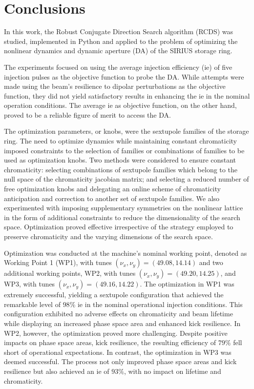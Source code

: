 \chapter{Conclusions}

In this work, the Robust Conjugate Direction Search algorithm (\gls*{RCDS}) was studied, implemented in Python and applied to the problem of optimizing the nonlinear dynamics and dynamic aperture (\gls*{DA}) of the SIRIUS storage ring.

The experiments focused on using the average injection efficiency (\gls*{ie}) of five injection pulses as the objective function to probe the \gls*{DA}. While attempts were made using the beam's resilience to dipolar perturbations as the objective function, they did not yield satisfactory results in enhancing the \gls*{ie} in the nominal operation conditions. The average \gls*{ie} as objective function, on the other hand, proved to be a reliable figure of merit to access the \gls*{DA}.

The optimization parameters, or knobs, were the sextupole families of the storage ring. The need to optimize dynamics while maintaining constant chromaticity imposed constraints to the selection of families or combinations of families to be used as optimization knobs. Two methods were considered to ensure constant chromaticity: selecting combinations of sextupole families which belong to the null space of the chromaticity jacobian matrix; and selecting a reduced number of free optimization knobs and delegating an online scheme of chromaticity anticipation and correction to another set of sextupole families. We also experimented with imposing supplementary symmetries on the nonlinear lattice in the form of additional constraints to reduce the dimensionality of the search space. Optimization proved effective irrespective of the strategy employed to preserve chromaticity and the varying dimensions of the search space.

Optimization was conducted at the machine's nominal working point, denoted as Working Point 1 (\gls*{WP1}), with tunes $(\nu_x, \nu_y)=(49.08, 14.14)$ and two additional working points, \gls*{WP2}, with tunes $(\nu_x, \nu_y)=(49.20, 14.25)$, and \gls*{WP3}, with tunes $(\nu_x, \nu_y)=(49.16, 14.22)$. The optimization in WP1 was extremely successful, yielding a sextupole configuration that achieved the remarkable level of $98\%$ \gls*{ie} in the nominal operational injection conditions. This configuration exhibited no adverse effects on chromaticity and beam lifetime while displaying an increased phase space area and enhanced kick resilience. In \gls*{WP2}, however, the optimization proved more challenging. Despite positive impacts on phase space areas, kick resilience, the resulting efficiency of $79\%$ fell short of operational expectations. In contrast, the optimization in \gls*{WP3} was deemed successful. The process not only improved phase space areas and kick resilience but also achieved an \gls*{ie} of $93\%$, with no impact on lifetime and chromaticity.

